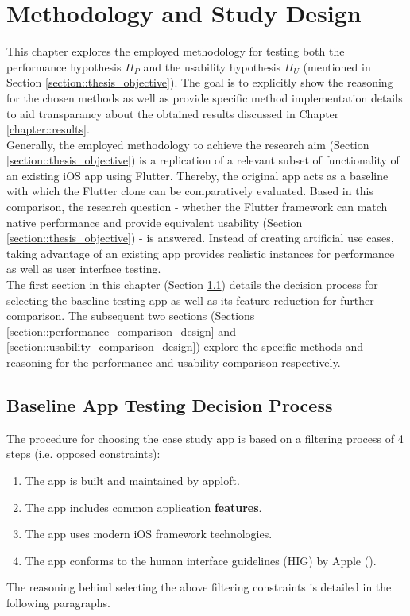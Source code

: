 \chapter{Methodology and Study Design}
This chapter explores the employed methodology for testing both the performance hypothesis $H_P$ and the usability hypothesis $H_U$ (mentioned in Section \ref{section::thesis_objective}). 
The goal is to explicitly show the reasoning for the chosen methods as well as provide specific method implementation details to aid transparancy about the obtained results discussed in Chapter \ref{chapter::results}.\\
Generally, the employed methodology to achieve the research aim (Section \ref{section::thesis_objective}) is a replication of a relevant subset of functionality of an existing iOS app using Flutter. Thereby, the original app acts as a baseline with which the Flutter clone 
can be comparatively evaluated. Based in this comparison, the research question - whether the Flutter framework can match native performance and provide equivalent usability (Section \ref{section::thesis_objective}) - is answered.
Instead of creating artificial use cases, taking advantage of an existing app provides realistic instances for performance as well as user interface testing.\\
The first section in this chapter (Section \ref{section::feature_selection}) details the decision process for selecting the baseline testing app as well as its feature reduction for further comparison. 
The subsequent two sections (Sections \ref{section::performance_comparison_design} and \ref{section::usability_comparison_design}) explore the specific methods and reasoning for the performance and 
usability comparison respectively.




\section{Baseline App Testing Decision Process} \label{section::feature_selection}
The procedure for choosing the case study app is based on a filtering process of 4 steps (i.e. opposed constraints):
\begin{enumerate}
    \item The app is built and maintained by apploft. \label{item::constraint_one}
    \item The app includes common application \textbf{features}. \label{item::constraint_two}
    \item The app uses modern iOS framework technologies. \label{item::constraint_three}
    \item The app conforms to the human interface guidelines (HIG) by Apple (\cite{Apple2021a}). \label{item::constraint_four}
\end{enumerate}
The reasoning behind selecting the above filtering constraints is detailed in the following paragraphs.

